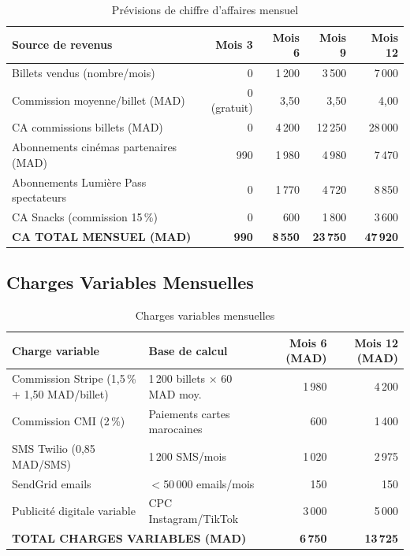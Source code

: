 \documentclass[12pt,a4paper,openany]{report}
\begin{document}
\begin{table}[H]
\centering
\small
\begin{tabular}{lrrrr}
\toprule
\textbf{Source de revenus} & \textbf{Mois 3} & \textbf{Mois 6} & \textbf{Mois 9} & \textbf{Mois 12} \\
\midrule
Billets vendus (nombre/mois)            & 0         & 1\,200    & 3\,500     & 7\,000 \\
Commission moyenne/billet (MAD)         & 0 (gratuit)& 3,50     & 3,50       & 4,00 \\
CA commissions billets (MAD)            & 0         & 4\,200    & 12\,250    & 28\,000 \\
Abonnements cinémas partenaires (MAD)   & 990       & 1\,980    & 4\,980     & 7\,470 \\
Abonnements Lumière Pass spectateurs    & 0         & 1\,770    & 4\,720     & 8\,850 \\
CA Snacks (commission 15\,\%)           & 0         & 600       & 1\,800     & 3\,600 \\
\midrule
\textbf{CA TOTAL MENSUEL (MAD)}         & \textbf{990} & \textbf{8\,550} & \textbf{23\,750} & \textbf{47\,920} \\
\bottomrule
\end{tabular}
\caption{Prévisions de chiffre d'affaires mensuel}
\label{tab:ca}
\end{table}

\subsection{Charges Variables Mensuelles}

\begin{table}[H]
\centering
\small
\begin{tabularx}{\textwidth}{p{4.8cm}Xrr}
\toprule
\textbf{Charge variable} & \textbf{Base de calcul} & \textbf{Mois 6 (MAD)} & \textbf{Mois 12 (MAD)} \\
\midrule
Commission Stripe (1,5\,\% + 1,50 MAD/billet)  & 1\,200 billets × 60 MAD moy. & 1\,980 & 4\,200 \\
Commission CMI (2\,\%)                          & Paiements cartes marocaines  & 600    & 1\,400 \\
SMS Twilio (0,85 MAD/SMS)                       & 1\,200 SMS/mois              & 1\,020 & 2\,975 \\
SendGrid emails                                 & $<$50\,000 emails/mois       & 150    & 150    \\
Publicité digitale variable                     & CPC Instagram/TikTok         & 3\,000 & 5\,000 \\
\midrule
\multicolumn{2}{l}{\textbf{TOTAL CHARGES VARIABLES (MAD)}} & \textbf{6\,750} & \textbf{13\,725} \\
\bottomrule
\end{tabularx}
\caption{Charges variables mensuelles}
\label{tab:cv}
\end{table}
\end{document}
